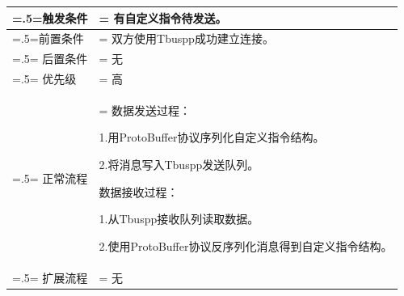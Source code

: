 {\begin{table}[htbp]
\begin{center}
\begin{tabularx}{0.8\textwidth}{ 
            | >{\centering\arraybackslash\hsize=.5\hsize\linewidth=\hsize}X 
            | >{\raggedright\arraybackslash\hsize=1.5\hsize\linewidth=\hsize}X 
            | }
            \hline
            触发条件 & 有自定义指令待发送。\\
            \hline
            前置条件 & 双方使用Tbuspp成功建立连接。\\
            \hline
            后置条件 & 无\\
            \hline
            优先级 & 高\\
            \hline
            正常流程 &  数据发送过程：\par 1.用ProtoBuffer协议序列化自定义指令结构。\par 2.将消息写入Tbuspp发送队列。\par 
                       数据接收过程：\par 1.从Tbuspp接收队列读取数据。\par 2.使用ProtoBuffer协议反序列化消息得到自定义指令结构。\\
            \hline
            扩展流程 & 无\\
            \hline
        \end{tabularx}
    \end{center}
\end{table}

}

